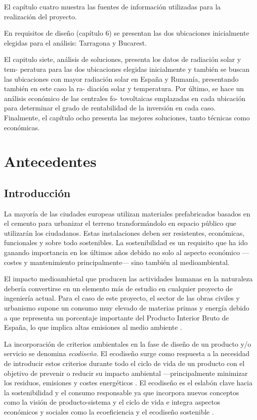 El capítulo cuatro muestra las fuentes de información utilizadas para la realización del proyecto.

En requisitos de diseño (capítulo 6) se presentan las dos ubicaciones inicialmente elegidas para el análisis: Tarragona y Bucarest.

El capitulo siete, análisis de soluciones, presenta los datos de radiación solar y tem- peratura para las dos ubicaciones elegidas inicialmente y también se buscan las ubicaciones con mayor radiación solar en España y Rumanía, presentando también en este caso la ra- diación solar y temperatura. Por último, se hace un análisis económico de las centrales fo- tovoltaicas emplazadas en cada ubicación para determinar el grado de rentabilidad de la inversión en cada caso. Finalmente, el capítulo ocho presenta las mejores soluciones, tanto técnicas como económicas.

\chapter{Antecedentes}

\section{Introducción}\label{sec:introantecedentes}
La mayoría de las ciudades europeas utilizan materiales prefabricados basados en el cemento para urbanizar el terreno transformándolo en espacio público que utilizarán los ciudadanos. Estas instalaciones deben ser resistentes, económicas, funcionales y sobre todo sostenibles. La sostenibilidad es un requisito que ha ido ganando importancia en los últimos años debido no solo al aspecto económico —costes y mantenimiento principalmente— sino también al medioambiental.

El impacto medioambietal que producen las actividades humanas en la naturaleza debería convertirse en un elemento más de estudio en cualquier proyecto de ingeniería actual. Para el caso de este proyecto, el sector de las obras civiles y urbanismo supone un consumo muy elevado de materias primas y energía debido a que representa un porcentaje importante del Producto Interior Bruto de España, lo que implica altas emisiones al medio ambiente \cite{minetur}.

La incorporación de criterios ambientales en la fase de diseño de un producto y/o servicio se denomina \textit{ecodiseño}. El ecodiseño surge como respuesta a la necesidad de introducir estos criterios durante todo el ciclo de vida de un producto con el objetivo de prevenir o reducir su impacto ambiental —principalmente minimizar los residuos, emisiones y costes energéticos \cite{iso14006}. El ecodiseño es el eslabón clave hacia la sostenibilidad y el consumo responsable ya que incorpora nuevos conceptos como la visión de producto-sistema y el ciclo de vida e integra aspectos económicos y sociales como la ecoeficiencia y el ecodiseño sostenible \cite{ihobeeco}.

